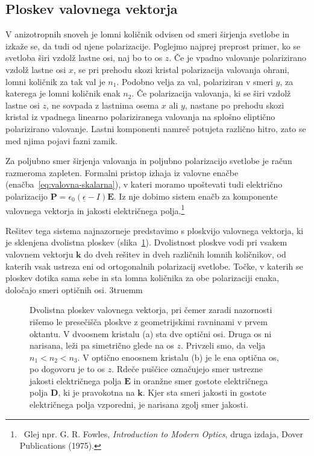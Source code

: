 \subsection*{Ploskev valovnega vektorja}
V anizotropnih snoveh je lomni količnik odvisen od smeri 
širjenja svetlobe in izkaže se, da tudi od njene polarizacije. Poglejmo 
najprej preprost primer, ko se svetloba širi vzdolž lastne osi, naj bo to os $z$.
Če je vpadno valovanje polarizirano vzdolž lastne osi $x$, se pri prehodu
skozi kristal polarizacija valovanja ohrani, lomni količnik za
tak val je $n_{1}$. Podobno velja za val, polariziran v smeri
$y$, za katerega je lomni količnik enak $n_{2}$. Če polarizacija valovanja, 
ki se širi vzdolž lastne osi $z$, ne sovpada z lastnima osema $x$ ali $y$, nastane po 
prehodu skozi kristal iz vpadnega linearno polariziranega valovanja na splošno eliptično
polarizirano valovanje. Lastni komponenti namreč potujeta različno
hitro, zato se med njima pojavi fazni zamik. 

Za poljubno smer širjenja valovanja in poljubno polarizacijo svetlobe je račun razmeroma zapleten. 
Formalni pristop izhaja iz valovne enačbe (enačba~\ref{eq:valovna-skalarna}), v kateri
moramo upoštevati tudi električno polarizacijo 
$\mathbf{P} = \epsilon_{0}(\underline{\epsilon}-I)\mathbf{E}$. Iz nje dobimo 
sistem enačb za komponente valovnega vektorja in jakosti električnega polja.\footnote{~Glej 
npr. G. R. Fowles, {\it Introduction to Modern Optics}, druga izdaja, Dover Publications (1975).}

Rešitev tega sistema najnazorneje predstavimo s ploskvijo valovnega vektorja, 
ki je sklenjena dvolistna ploskev (slika~\ref{kploskev}). Dvolistnost ploskve
vodi pri vsakem valovnem vektorju $\mathbf{k}$ do dveh rešitev in dveh različnih lomnih
količnikov, od katerih vsak ustreza eni od ortogonalnih polarizacij svetlobe. Točke, v katerih
se ploskev dotika sama sebe in sta lomna količnika za obe polarizaciji enaka, 
določajo smeri optičnih osi. 
\vglue3truemm
\begin{figure}[ht]
\centering
\def\svgwidth{124truemm} 

\caption{Dvolistna ploskev valovnega vektorja, pri čemer zaradi nazornosti rišemo le presečišča
ploskve z geometrijskimi ravninami v prvem oktantu. 
V dvoosnem kristalu (a) sta dve optični osi. Druga os ni narisana, leži pa 
simetrično glede na os $z$. Privzeli smo, da velja $n_1<n_2<n_3$.
V optično enoosnem kristalu (b) je le ena optična os, 
po dogovoru je to os $z$. Rdeče puščice označujejo smer ustrezne jakosti električnega polja $\mathbf{E}$
in oranžne smer gostote električnega polja $\mathbf{D}$, ki je pravokotna na $\mathbf{k}$. 
Kjer sta smeri jakosti in gostote električnega polja vzporedni, je narisana zgolj smer jakosti.}
\label{kploskev}
\end{figure}

